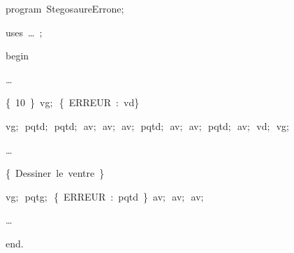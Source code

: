 
{
\parindent {}
\medskip

\carrenoir
\vspace{\neglskip}\mbox{\blc  \idt  \mcl program\idt \ StegosaureErrone$;$
}\par 
\vspace{\neglskip}\mbox{\blc \blk\idt \mcl uses\idt \ \ldots\ $;$
}\par 
\vspace{\neglskip}\mbox{\blc  \idt  \mcl begin\idt }\par 
\vspace{\neglskip}\mbox{\blc  \blk\blk\idt  \ldots }\par 
\vspace{\neglskip}\mbox{\blc  \blk\blk\idt  \cmt  \{\ 10\ \}\idt \ vg$;$\ \cmt  \{\ ERREUR\ :\ vd\}\idt \ }\par 
\vspace{\neglskip}\mbox{\blc  \blk\blk\blk\blk\blk\blk\blk\blk\blk\idt  vg$;$\ pqtd$;$\ pqtd$;$\ av$;$\ av$;$\ av$;$\ pqtd$;$\ av$;$\ av$;$\ pqtd$;$\ av$;$\ vd$;$\ vg$;$\ }\par 
\vspace{\neglskip}\mbox{\blc  \blk\blk\idt  \ldots }\par 
\vspace{\neglskip}\mbox{\blc  \blk\idt  \cmt  \{\ Dessiner\ le\ ventre\ \}\idt }\par 
\vspace{\neglskip}\mbox{\blc  \blk\blk\idt  vg$;$\ pqtg$;$\ \cmt  \{\ ERREUR\ :\ pqtd\ \}\idt \ av$;$\ av$;$\ av$;$\ }\par 
\vspace{\neglskip}\mbox{\blc  \blk\blk\idt  \ldots }\par 
\vspace{\neglskip}\mbox{\blc  \idt  \mcl end\idt $.$}\par 

\medskip }

